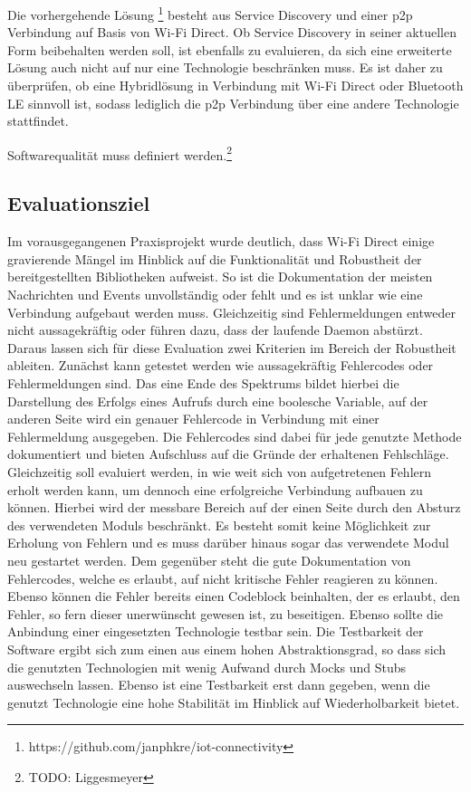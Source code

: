 \documentclass[12pt,a4paper]{article}
\begin{document}
        Die vorhergehende Lösung \footnote{https://github.com/janphkre/iot-connectivity} besteht aus Service Discovery und einer p2p Verbindung auf Basis von Wi-Fi Direct. Ob Service Discovery in seiner aktuellen Form beibehalten werden soll, ist ebenfalls zu evaluieren, da sich eine erweiterte Lösung auch nicht auf nur eine Technologie beschränken muss. Es ist daher zu überprüfen, ob eine Hybridlösung in Verbindung mit Wi-Fi Direct oder Bluetooth LE sinnvoll ist, sodass lediglich die p2p Verbindung über eine andere Technologie stattfindet.

		Softwarequalität muss definiert werden.\footnote{TODO: Liggesmeyer}
        
	\subsection{Evaluationsziel}	
	
        Im vorausgegangenen Praxisprojekt wurde deutlich, dass Wi-Fi Direct einige gravierende Mängel im Hinblick auf die Funktionalität und Robustheit der bereitgestellten Bibliotheken aufweist. So ist die Dokumentation der meisten Nachrichten und Events unvollständig oder fehlt und es ist unklar wie eine Verbindung aufgebaut werden muss. Gleichzeitig sind Fehlermeldungen entweder nicht aussagekräftig oder führen dazu, dass der laufende Daemon abstürzt.
        Daraus lassen sich für diese Evaluation zwei Kriterien im Bereich der Robustheit ableiten.
        Zunächst kann getestet werden wie aussagekräftig Fehlercodes oder Fehlermeldungen sind.
        Das eine Ende des Spektrums bildet hierbei die Darstellung des Erfolgs eines Aufrufs durch eine boolesche Variable, auf der anderen Seite wird ein genauer Fehlercode in Verbindung mit einer Fehlermeldung ausgegeben. Die Fehlercodes sind dabei für jede genutzte Methode dokumentiert und bieten Aufschluss auf die Gründe der erhaltenen Fehlschläge. 
        Gleichzeitig soll evaluiert werden, in wie weit sich von aufgetretenen Fehlern erholt werden kann, um dennoch eine erfolgreiche Verbindung aufbauen zu können. Hierbei wird der messbare Bereich auf der einen Seite durch den Absturz des verwendeten Moduls beschränkt. Es besteht somit keine Möglichkeit zur Erholung von Fehlern und es muss darüber hinaus sogar das verwendete Modul neu gestartet werden. Dem gegenüber steht die gute Dokumentation von Fehlercodes, welche es erlaubt, auf nicht kritische Fehler reagieren zu können. Ebenso können die Fehler bereits einen Codeblock beinhalten, der es erlaubt, den Fehler, so fern dieser unerwünscht gewesen ist, zu beseitigen.
        Ebenso sollte die Anbindung einer eingesetzten Technologie testbar sein. Die Testbarkeit der Software ergibt sich zum einen aus einem hohen Abstraktionsgrad, so dass sich die genutzten Technologien mit wenig Aufwand durch Mocks und Stubs auswechseln lassen. Ebenso ist eine Testbarkeit erst dann gegeben, wenn die genutzt Technologie eine hohe Stabilität im Hinblick auf Wiederholbarkeit bietet.
        
\end{document}
